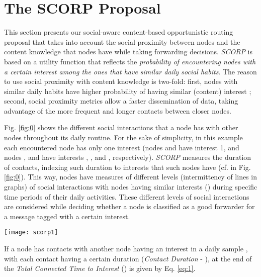\documentclass[lnicst]{svmultln}
\begin{document}
\section{The SCORP Proposal\label{sec:SCORP}}

This section presents our social-aware content-based opportunistic
routing proposal that takes into account the social proximity between
nodes and the content knowledge that nodes have while taking forwarding
decisions. \emph{SCORP} is based on a utility function that reflects
the \emph{probability of encountering nodes with a certain interest
among the ones that have similar daily social habits}. The reason
to use social proximity with content knowledge is two-fold: first,
nodes with similar daily habits have higher probability of having
similar (content) interest \cite{socialcast}; second, social proximity
metrics allow a faster dissemination of data, taking advantage of
the more frequent and longer contacts between closer nodes.

Fig. \ref{fig:0} shows the different social interactions that a node
 has with other nodes throughout its daily routine. For the sake
of simplicity, in this example each encountered node has only one
interest (nodes  and  have interest 1, and nodes , 
and  have interests , , and , respectively). \emph{SCORP}
measures the duration of contacts, indexing such duration to interests
that such nodes have (cf.  in Fig. \ref{fig:0}). This
way, nodes have measures of different levels (intermittency of lines
in graphs) of social interactions with nodes having similar interests
() during specific time periods of their daily activities.
These different levels of social interactions are considered while
deciding whether a node is classified as a good forwarder for a message
tagged with a certain interest.

\begin{figure*}
\begin{centering}
\vspace{-0.4cm}
\texttt{[image: scorp1]}\vspace{-0.3cm}

\par\end{centering}

\caption{\label{fig:0}Contacts that node  has with nodes having interests
 () in different daily samples .}
\vspace{-0.4cm}
\end{figure*}


If a node  has  contacts with another node having an interest
 in a daily sample , with each contact  having
a certain duration (\emph{Contact} \emph{Duration} - ),
at the end of  the \emph{Total Connected Time to Interest
} () is given by Eq. \ref{eq:1}.
\end{document}
